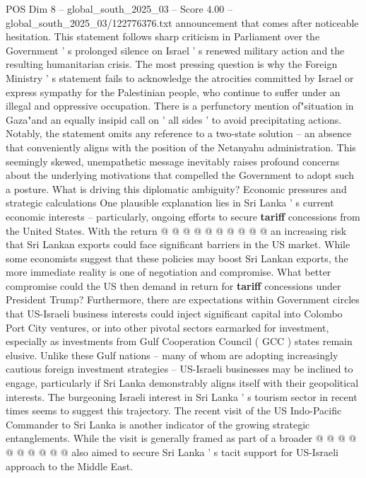 \begin{textsample}{POS Dim 8 – global\_south\_2025\_03 – Score 4.00 – global\_south\_2025\_03/122776376.txt}  \label{ex:f8_pos_150}
announcement that comes after noticeable hesitation.
This statement follows sharp criticism in Parliament over the Government ' s prolonged silence on Israel ' s renewed military action and the resulting humanitarian crisis.
The most pressing question is why the Foreign Ministry ' s statement fails to acknowledge the atrocities committed by Israel or express sympathy for the Palestinian people, who continue to suffer under an illegal and oppressive occupation.
There is a perfunctory mention of"situation in Gaza"and an equally insipid call on ' all sides ' to avoid precipitating actions.
Notably, the statement omits any reference to a two-state solution -- an absence that conveniently aligns with the position of the Netanyahu administration.
This seemingly skewed, unempathetic message inevitably raises profound concerns about the underlying motivations that compelled the Government to adopt such a posture.
What is driving this diplomatic ambiguity?
Economic pressures and strategic calculations One plausible explanation lies in Sri Lanka ' s current economic interests -- particularly, ongoing efforts to secure \textbf{tariff} concessions from the United States.
With the return @ @ @ @ @ @ @ @ @ @ an increasing risk that Sri Lankan exports could face significant barriers in the US market.
While some economists suggest that these policies may boost Sri Lankan exports, the more immediate reality is one of negotiation and compromise.
What better compromise could the US then demand in return for \textbf{tariff} concessions under President Trump?
Furthermore, there are expectations within Government circles that US-Israeli business interests could inject significant capital into Colombo Port City ventures, or into other pivotal sectors earmarked for investment, especially as investments from Gulf Cooperation Council ( GCC ) states remain elusive.
Unlike these Gulf nations -- many of whom are adopting increasingly cautious foreign investment strategies -- US-Israeli businesses may be inclined to engage, particularly if Sri Lanka demonstrably aligns itself with their geopolitical interests.
The burgeoning Israeli interest in Sri Lanka ' s tourism sector in recent times seems to suggest this trajectory.
The recent visit of the US Indo-Pacific Commander to Sri Lanka is another indicator of the growing strategic entanglements.
While the visit is generally framed as part of a broader @ @ @ @ @ @ @ @ @ @ also aimed to secure Sri Lanka ' s tacit support for US-Israeli approach to the Middle East.

\end{textsample}
